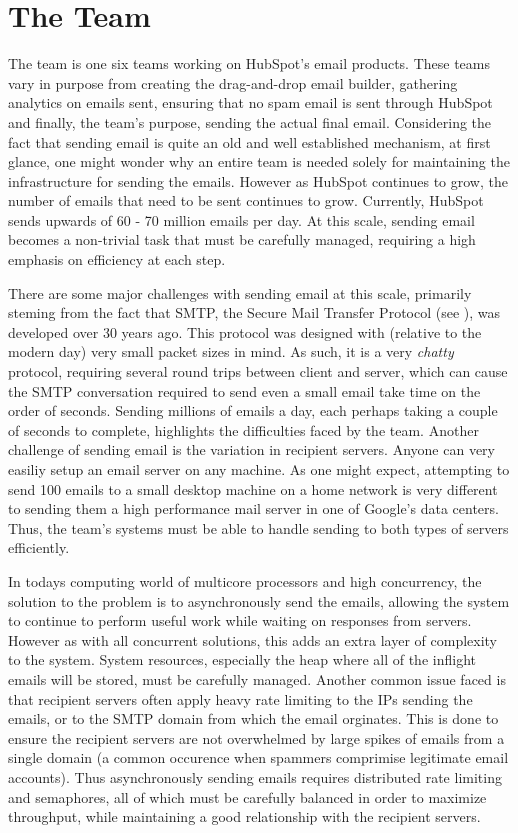 \section{The \team{} Team} \label{sec:emailSendingInfra}
The \team{} team is one six teams working on HubSpot's email products. These teams vary in purpose from creating the drag-and-drop email builder, gathering analytics on emails sent, ensuring that no spam email is sent through HubSpot and finally, the \team{} team's purpose, sending the actual final email. Considering the fact that sending email is quite an old and well established mechanism, at first glance, one might wonder why an entire team is needed solely for maintaining the infrastructure for sending the emails. However as HubSpot continues to grow, the number of emails that need to be sent continues to grow. Currently, HubSpot sends upwards of 60 - 70 million emails per day. At this scale, sending email becomes a non-trivial task that must be carefully managed, requiring a high emphasis on efficiency at each step. 

There are some major challenges with sending email at this scale, primarily steming from the fact that SMTP, the Secure Mail Transfer Protocol (see ), was developed over 30 years ago. This protocol was designed with (relative to the modern day) very small packet sizes in mind. As such, it is a very \textit{chatty} protocol, requiring several round trips between client and server, which can cause the SMTP conversation required to send even a small email take time on the order of seconds. Sending millions of emails a day, each perhaps taking a couple of seconds to complete, highlights the difficulties faced by the \team{} team. Another challenge of sending email is the variation in recipient servers. Anyone can very easiliy setup an email server on any machine. As one might expect, attempting to send 100 emails to a small desktop machine on a home network is very different to sending them a high performance mail server in one of Google's data centers. Thus, the \team{} team's systems must be able to handle sending to both types of servers efficiently. 

In todays computing world of multicore processors and high concurrency, the solution to the problem is to asynchronously send the emails, allowing the system to continue to perform useful work while waiting on responses from servers. However as with all concurrent solutions, this adds an extra layer of complexity to the system. System resources, especially the heap where all of the inflight emails will be stored, must be carefully managed. Another common issue faced is that recipient servers often apply heavy rate limiting to the IPs sending the emails, or to the SMTP domain from which the email orginates. This is done to ensure the recipient servers are not overwhelmed by large spikes of emails from a single domain (a common occurence when spammers comprimise legitimate email accounts). Thus asynchronously sending emails requires distributed rate limiting and semaphores, all of which must be carefully balanced in order to maximize throughput, while maintaining a good relationship with the recipient servers. 

